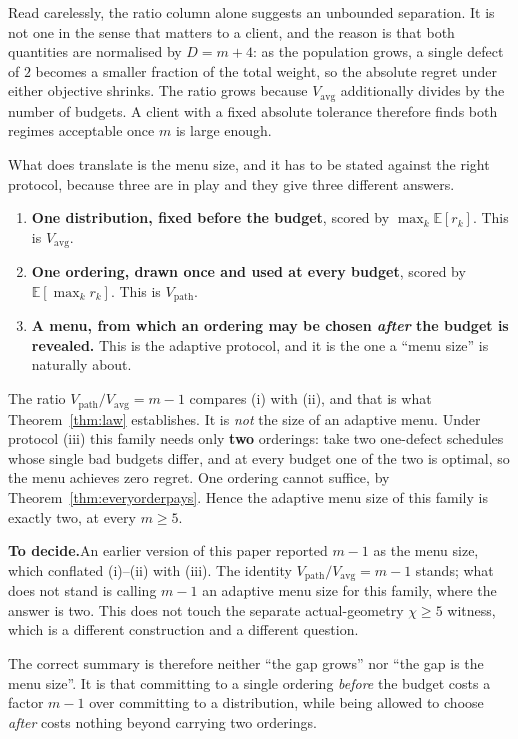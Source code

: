 \documentclass[conference]{IEEEtran}
\theoremstyle{definition}
\newif\ifshownotes\shownotestrue
\newcommand{\TODOPAR}[1]{\ifshownotes\par\vspace{2pt}\noindent%
  {\color{todocol}\textsf{\footnotesize\textbf{To decide.}\;#1}}\par\vspace{2pt}\fi}
\begin{document}
Read carelessly, the ratio column alone suggests an unbounded separation. It is not one in
the sense that matters to a client, and the reason is that both quantities are normalised by
$D=m+4$: as the population grows, a single defect of $2$ becomes a smaller fraction of the
total weight, so the absolute regret under either objective shrinks. The ratio grows because
$V_{\mathrm{avg}}$ additionally divides by the number of budgets. A client with a fixed
absolute tolerance therefore finds both regimes acceptable once $m$ is large enough.

What does translate is the menu size, and it has to be stated against the right protocol,
because three are in play and they give three different answers.

\begin{enumerate}
\item[(i)] \textbf{One distribution, fixed before the budget}, scored by
$\max_{k}\mathbb{E}[r_{k}]$. This is $V_{\mathrm{avg}}$.
\item[(ii)] \textbf{One ordering, drawn once and used at every budget}, scored by
$\mathbb{E}[\max_{k}r_{k}]$. This is $V_{\mathrm{path}}$.
\item[(iii)] \textbf{A menu, from which an ordering may be chosen \emph{after} the budget is
revealed.} This is the adaptive protocol, and it is the one a ``menu size'' is naturally about.
\end{enumerate}

The ratio $V_{\mathrm{path}}/V_{\mathrm{avg}}=m-1$ compares (i) with (ii), and that is what
Theorem~\ref{thm:law} establishes. It is \emph{not} the size of an adaptive menu. Under
protocol (iii) this family needs only \textbf{two} orderings: take two one-defect schedules
whose single bad budgets differ, and at every budget one of the two is optimal, so the menu
achieves zero regret. One ordering cannot suffice, by Theorem~\ref{thm:everyorderpays}. Hence
the adaptive menu size of this family is exactly two, at every $m\ge5$.

\TODOPAR{An earlier version of this paper reported $m-1$ as the menu size, which conflated
(i)--(ii) with (iii). The identity $V_{\mathrm{path}}/V_{\mathrm{avg}}=m-1$ stands; what does
not stand is calling $m-1$ an adaptive menu size for this family, where the answer is two.
This does not touch the separate actual-geometry $\chi\ge5$ witness, which is a different
construction and a different question.}

The correct summary is therefore neither ``the gap grows'' nor ``the gap is the menu size''.
It is that committing to a single ordering \emph{before} the budget costs a factor $m-1$ over
committing to a distribution, while being allowed to choose \emph{after} costs nothing beyond
carrying two orderings.
\end{document}
